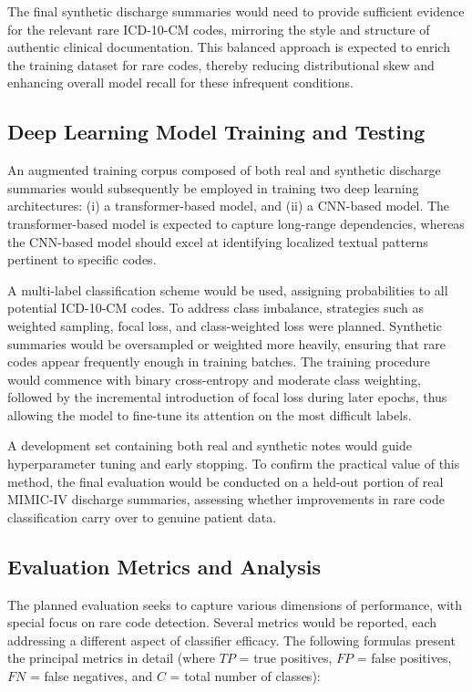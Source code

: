 The final synthetic discharge summaries would need to provide sufficient evidence for the relevant rare ICD-10-CM codes, mirroring the style and structure of authentic clinical documentation. This balanced approach is expected to enrich the training dataset for rare codes, thereby reducing distributional skew and enhancing overall model recall for these infrequent conditions.

\subsection{Deep Learning Model Training and Testing}\label{sec:p1:dl_training}
An augmented training corpus composed of both real and synthetic discharge summaries would subsequently be employed in training two deep learning architectures: (i) a transformer-based model, and (ii) a CNN-based model. The transformer-based model is expected to capture long-range dependencies, whereas the CNN-based model should excel at identifying localized textual patterns pertinent to specific codes.

A multi-label classification scheme would be used, assigning probabilities to all potential ICD-10-CM codes. To address class imbalance, strategies such as weighted sampling, focal loss, and class-weighted loss were planned. Synthetic summaries would be oversampled or weighted more heavily, ensuring that rare codes appear frequently enough in training batches. The training procedure would commence with binary cross-entropy and moderate class weighting, followed by the incremental introduction of focal loss during later epochs, thus allowing the model to fine-tune its attention on the most difficult labels.

A development set containing both real and synthetic notes would guide hyperparameter tuning and early stopping. To confirm the practical value of this method, the final evaluation would be conducted on a held-out portion of real MIMIC-IV discharge summaries, assessing whether improvements in rare code classification carry over to genuine patient data.

\subsection{Evaluation Metrics and Analysis}\label{sec:p1:eval_metrics}
The planned evaluation seeks to capture various dimensions of performance, with special focus on rare code detection. Several metrics would be reported, each addressing a different aspect of classifier efficacy. The following formulas present the principal metrics in detail (where $TP$ = true positives, $FP$ = false positives, $FN$ = false negatives, and $C$ = total number of classes):

